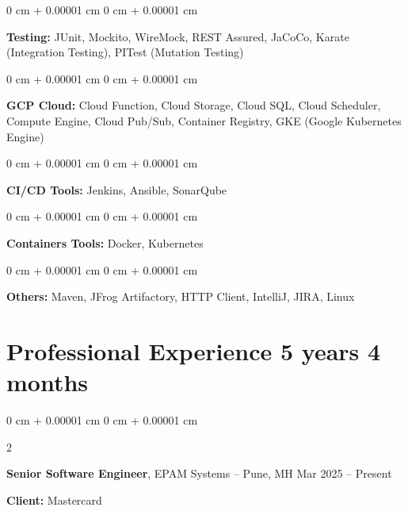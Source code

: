 \documentclass[10pt, letterpaper]{article}
\newenvironment{onecolentry}{
    \begin{adjustwidth}{
        0 cm + 0.00001 cm
    }{
        0 cm + 0.00001 cm
    }
}{
    \end{adjustwidth}
} %
\newenvironment{twocolentry}[2][]{
    \onecolentry
    \def\secondColumn{#2}
    \setcolumnwidth{\fill, 4.5 cm}
    \begin{paracol}{2}
}{
    \switchcolumn \raggedleft \secondColumn
    \end{paracol}
    \endonecolentry
} %
\begin{document}
        \vspace{0.15 cm}

        \begin{onecolentry}
            \textbf{Testing:} JUnit, Mockito, WireMock, REST Assured, JaCoCo, Karate (Integration Testing), PITest (Mutation Testing)
        \end{onecolentry}

        \vspace{0.15 cm}

        \begin{onecolentry}
            \textbf{GCP Cloud:} Cloud Function, Cloud Storage, Cloud SQL, Cloud Scheduler, Compute Engine, Cloud Pub/Sub, Container Registry, GKE (Google Kubernetes Engine)
        \end{onecolentry}

        \vspace{0.15 cm}

        \begin{onecolentry}
            \textbf{CI/CD Tools:} Jenkins, Ansible, SonarQube
        \end{onecolentry}

        \vspace{0.15 cm}

        \begin{onecolentry}
            \textbf{Containers Tools:} Docker, Kubernetes
        \end{onecolentry}

        \vspace{0.15 cm}

        \begin{onecolentry}
            \textbf{Others:} Maven, JFrog Artifactory, HTTP Client, IntelliJ, JIRA, Linux
        \end{onecolentry}


        \vspace{0.2 cm}

        
    
    \section{Professional Experience \hspace{0.3 cm} 5 years 4 months}
        
        \begin{twocolentry}{
            Mar 2025 – Present
        }
            \textbf{Senior Software Engineer}, EPAM Systems -- Pune, MH\end{twocolentry}
        \textbf{Client:} Mastercard
\end{document}
